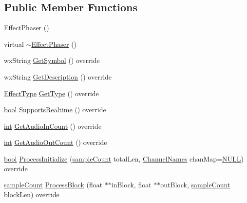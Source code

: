 \subsection*{Public Member Functions}
\begin{DoxyCompactItemize}
\item 
\hyperlink{class_effect_phaser_aec688e2325f190d9ea900c21d53faea3}{Effect\+Phaser} ()
\item 
virtual \hyperlink{class_effect_phaser_ab36e333505e71e57167a0070ac0b1794}{$\sim$\+Effect\+Phaser} ()
\item 
wx\+String \hyperlink{class_effect_phaser_a942b04c20828fffe046dcf4ab28cb069}{Get\+Symbol} () override
\item 
wx\+String \hyperlink{class_effect_phaser_abee80667cf71bf7bb5909df3eef6e1dd}{Get\+Description} () override
\item 
\hyperlink{_effect_interface_8h_a4809a7bb3fd1a421902a667cc1405d43}{Effect\+Type} \hyperlink{class_effect_phaser_a85e1399d3754da238ff6279559336116}{Get\+Type} () override
\item 
\hyperlink{mac_2config_2i386_2lib-src_2libsoxr_2soxr-config_8h_abb452686968e48b67397da5f97445f5b}{bool} \hyperlink{class_effect_phaser_ac9d4244fee9f1239d9f5bf548c4baad3}{Supports\+Realtime} () override
\item 
\hyperlink{xmltok_8h_a5a0d4a5641ce434f1d23533f2b2e6653}{int} \hyperlink{class_effect_phaser_a8873f42ccd8bd10605dbf0022d1b4b18}{Get\+Audio\+In\+Count} () override
\item 
\hyperlink{xmltok_8h_a5a0d4a5641ce434f1d23533f2b2e6653}{int} \hyperlink{class_effect_phaser_a01928a141af85ff7e7259e08bfe0887a}{Get\+Audio\+Out\+Count} () override
\item 
\hyperlink{mac_2config_2i386_2lib-src_2libsoxr_2soxr-config_8h_abb452686968e48b67397da5f97445f5b}{bool} \hyperlink{class_effect_phaser_a4861dad76df38e4340e92ec724c761b0}{Process\+Initialize} (\hyperlink{include_2audacity_2_types_8h_afa427e1f521ea5ec12d054e8bd4d0f71}{sample\+Count} total\+Len, \hyperlink{include_2audacity_2_types_8h_a4f0f42a04250c39bbe0ce6cb26aa3b48}{Channel\+Names} chan\+Map=\hyperlink{px__mixer_8h_a070d2ce7b6bb7e5c05602aa8c308d0c4}{N\+U\+LL}) override
\item 
\hyperlink{include_2audacity_2_types_8h_afa427e1f521ea5ec12d054e8bd4d0f71}{sample\+Count} \hyperlink{class_effect_phaser_a6265e0fd361c0704757214261e519bf9}{Process\+Block} (float $\ast$$\ast$in\+Block, float $\ast$$\ast$out\+Block, \hyperlink{include_2audacity_2_types_8h_afa427e1f521ea5ec12d054e8bd4d0f71}{sample\+Count} block\+Len) override

\end{DoxyCompactItemize}
